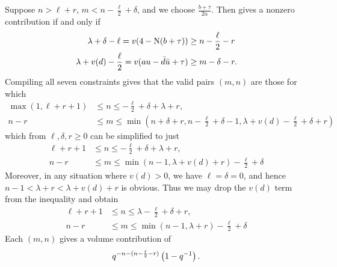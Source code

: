 \begin{description}
Suppose $n > \ell + r$,
$m < n - \frac{\ell}{2} + \delta$, and we choose $\frac{b+\tau}{2a}$.
Then  gives a nonzero contribution if and only if
\begin{align*}
  \lambda + \delta - \ell = v(4-\operatorname{N}(b+\tau)) &\geq n - \frac{\ell}{2} - r \\
  \lambda + v(d) - \frac{\ell}{2} = v(au-\bar d \bar u + \tau) & \geq m - \delta - r.
\end{align*}
Compiling all seven constraints gives that the valid pairs $(m,n)$ are those for which
\begin{align*}
  \max(1, \ell+r+1) &\leq n \leq -\frac{\ell}{2} + \delta + \lambda + r, \\
  n-r &\leq m \leq \min\left( n+\delta+r, n - \frac{\ell}{2}+\delta - 1,
    \lambda + v(d) -\frac{\ell}{2}+\delta+r \right)
\end{align*}
which from $\ell, \delta, r \ge 0$ can be simplified to just
\begin{align*}
  \ell+r+1 &\leq n \leq  -\frac{\ell}{2} + \delta + \lambda + r, \\
  n-r &\leq m \leq \min(n-1, \lambda + v(d) + r) - \frac{\ell}{2} + \delta
\end{align*}
Moreover, in any situation where $v(d) > 0$, we have $\ell = \delta = 0$,
and hence $n-1 < \lambda + r < \lambda + v(d) + r$ is obvious.
Thus we may drop the $v(d)$ term from the inequality and obtain
\begin{equation}
  \begin{aligned}
    \ell+r+1 &\leq n \leq \lambda - \frac{\ell}{2} + \delta + r, \\
    n-r &\leq m \leq \min(n-1, \lambda + r) - \frac{\ell}{2} + \delta
  \end{aligned}
  \label{eq:even_case3_plus}
\end{equation}
Each $(m,n)$ gives a volume contribution of
\[ q^{-n - (n - \frac{\ell}{2} - r)} \left( 1 - q^{-1} \right). \]


\end{description}
